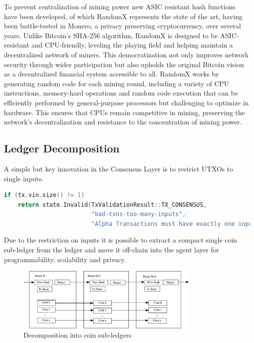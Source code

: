 \documentclass{article}
\begin{document}
\vspace{2mm}

To prevent centralization of mining power new ASIC resistant hash functions have been developed, of which RandomX represents the state of the art, having been battle-tested in Monero, a privacy preserving cryptocurrency, over several years. Unlike Bitcoin's SHA-256 algorithm, RandomX is designed to be ASIC-resistant and CPU-friendly, leveling the playing field and helping maintain a decentralized network of miners. This democratization not only improves network security through wider participation but also upholds the original Bitcoin vision as a decentralized financial system accessible to all. RandomX works by generating random code for each mining round, including a variety of CPU instructions, memory-hard operations and random code execution that can be efficiently performed by general-purpose processors but challenging to optimize in hardware. This ensures that CPUs remain competitive in mining, preserving the network's decentralization and resistance to the concentration of mining power.




\subsection*{Ledger Decomposition}


A simple but key innovation in the Consensus Layer is to restrict UTXOs to single inputs.

\begin{center}
\begin{lstlisting}[language=C++, linewidth=0.8\textwidth]
if (tx.vin.size() != 1)
    return state.Invalid(TxValidationResult::TX_CONSENSUS, 
                         "bad-txns-too-many-inputs", 
                         "Alpha Transactions must have exactly one input");
\end{lstlisting}
\end{center}

 Due to the restriction on inputs it is possible to extract a compact single coin sub-ledger from the ledger and move it off-chain into the agent layer for programmability, scalability and privacy. 
 
\begin{figure}[H]
    \centering
    \includegraphics[width=0.8\textwidth]{CoinLedger.png}
    \caption{Decomposition into coin sub-ledgers}
    \label{fig:coinledger}
\end{figure}
\vspace{2mm}
\end{document}

